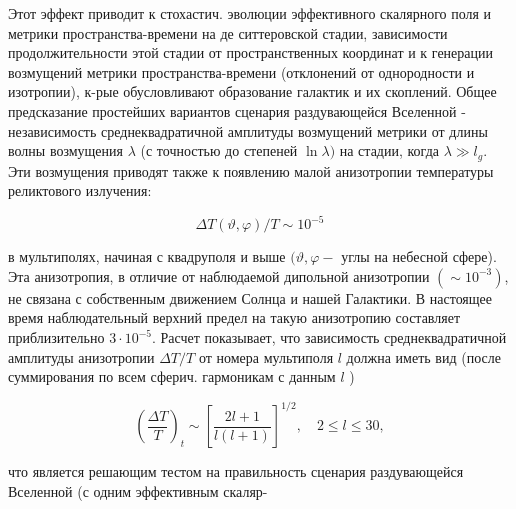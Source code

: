 \documentclass[10pt]{article}
\begin{document}
Этот эффект приводит к стохастич. эволюции эффективного скалярного поля и метрики пространства-времени на де ситтеровской стадии, зависимости продолжительности этой стадии от пространственных координат и к генерации возмущений метрики пространства-времени (отклонений от однородности и изотропии), к-рые обусловливают образование галактик и их скоплений. Общее предсказание простейших вариантов сценария раздувающейся Вселенной - независимость среднеквадратичной амплитуды возмущений метрики от длины волны возмущения $\lambda$ (с точностью до степеней $\ln \lambda)$ на стадии, когда $\lambda \gg l_{g}$. Эти возмущения приводят также к появлению малой анизотропии температуры реликтового излучения:



\[

\Delta T(\vartheta, \varphi) / T \sim 10^{-5}

\]



в мультиполях, начиная с квадруполя и выше $(\vartheta, \varphi-$ углы на небесной сфере). Эта анизотропия, в отличие от наблюдаемой дипольной анизотропии $\left(\sim 10^{-3}\right)$, не связана с собственным движением Солнца и нашей Галактики. В настоящее время наблюдательный верхний предел на такую анизотропию составляет приблизительно $3 \cdot 10^{-5}$. Расчет показывает, что зависимость среднеквадратичной амплитуды анизотропии $\Delta T / T$ от номера мультиполя $l$ должна иметь вид (после суммирования по всем сферич. гармоникам с данным $l$ )



\[

\left(\frac{\Delta T}{T}\right)_{t} \sim\left[\frac{2 l+1}{l(l+1)}\right]^{1 / 2}, \quad 2 \leqslant l \leqslant 30,

\]



что является решающим тестом на правильность сценария раздувающейся Вселенной (с одним эффективным скаляр-
\end{document}
